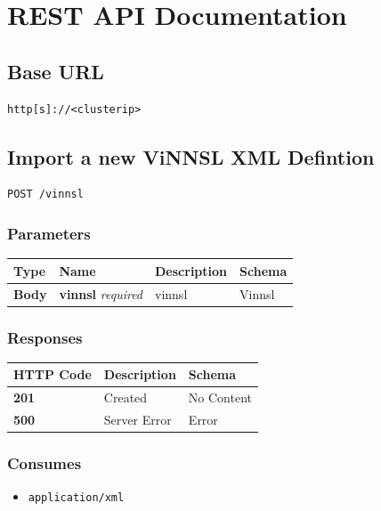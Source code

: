 \section{REST API Documentation}\label{rest-api-documentation}

\subsection{Base URL}\label{base-url}

\begin{verbatim}
http[s]://<clusterip>
\end{verbatim}

\subsection{Import a new ViNNSL XML
Defintion}\label{import-a-new-vinnsl-xml-defintion}

\begin{verbatim}
POST /vinnsl
\end{verbatim}

\subsubsection{Parameters}\label{parameters}

\begin{longtable}[]{@{}llll@{}}
\toprule
Type & Name & Description & Schema\tabularnewline
\midrule
\endhead
\textbf{Body} & \textbf{vinnsl} \emph{required} & vinnsl &
Vinnsl\tabularnewline
\bottomrule
\end{longtable}

\subsubsection{Responses}\label{responses}

\begin{longtable}[]{@{}lll@{}}
\toprule
HTTP Code & Description & Schema\tabularnewline
\midrule
\endhead
\textbf{201} & Created & No Content\tabularnewline
\textbf{500} & Server Error & Error\tabularnewline
\bottomrule
\end{longtable}

\subsubsection{Consumes}\label{consumes}

\begin{itemize}
\tightlist
\item
  \texttt{application/xml}
\end{itemize}


